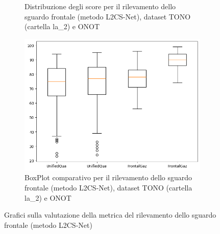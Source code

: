 \documentclass[12pt,a4paper,openright,twoside]{book}
\begin{document}
\begin{figure}[htbp]
\begin{subfigure}{0.49\textwidth}
        \caption{Distribuzione degli score per il rilevamento dello sguardo frontale (metodo L2CS-Net), dataset TONO (cartella la\_2) e ONOT}
        \label{fig:score_distribution_tono_onot_l2_frontal_gaze_l2cs}
    \end{subfigure}
    \hfill
    \begin{subfigure}{0.49\textwidth}
        \centering
        \includegraphics[width=.7\linewidth]{figures/box-plot-tono-onot-l2-frontal-gaze-l2cs.png}
        \caption{BoxPlot comparativo per il rilevamento dello sguardo frontale (metodo L2CS-Net), dataset TONO (cartella la\_2) e ONOT}
        \label{fig:box_plot_tono_onot_l2_frontal_gaze_l2cs}
    \end{subfigure}

    \caption{Grafici sulla valutazione della metrica del rilevamento dello sguardo frontale (metodo L2CS-Net)}
\end{figure}
\end{document}
